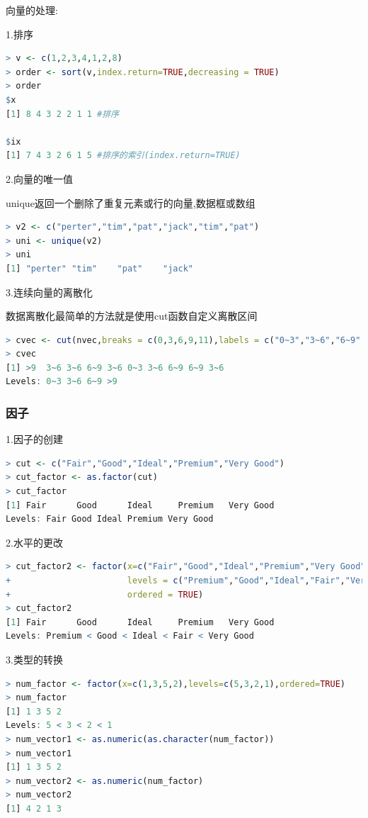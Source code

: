 \documentclass[11pt,a4paper,oneside]{book}
\begin{document}
向量的处理:

1.排序
\begin{lstlisting}[language=r]
> v <- c(1,2,3,4,1,2,8)
> order <- sort(v,index.return=TRUE,decreasing = TRUE)
> order
$x
[1] 8 4 3 2 2 1 1 #排序

$ix
[1] 7 4 3 2 6 1 5 #排序的索引(index.return=TRUE)
\end{lstlisting}

2.向量的唯一值

unique返回一个删除了重复元素或行的向量,数据框或数组
\begin{lstlisting}[language=r]
> v2 <- c("perter","tim","pat","jack","tim","pat")
> uni <- unique(v2)
> uni
[1] "perter" "tim"    "pat"    "jack"  
\end{lstlisting}

3.连续向量的离散化

数据离散化最简单的方法就是使用cut函数自定义离散区间
\begin{lstlisting}[language=r]
> cvec <- cut(nvec,breaks = c(0,3,6,9,11),labels = c("0~3","3~6","6~9",">9"))
> cvec
[1] >9  3~6 3~6 6~9 3~6 0~3 3~6 6~9 6~9 3~6
Levels: 0~3 3~6 6~9 >9
\end{lstlisting}

\subsubsection{因子}
1.因子的创建
\begin{lstlisting}[language=r]
> cut <- c("Fair","Good","Ideal","Premium","Very Good")
> cut_factor <- as.factor(cut)
> cut_factor
[1] Fair      Good      Ideal     Premium   Very Good
Levels: Fair Good Ideal Premium Very Good
\end{lstlisting}

2.水平的更改
\begin{lstlisting}[language=r]
> cut_factor2 <- factor(x=c("Fair","Good","Ideal","Premium","Very Good"),
+                       levels = c("Premium","Good","Ideal","Fair","Very Good"),
+                       ordered = TRUE)
> cut_factor2
[1] Fair      Good      Ideal     Premium   Very Good
Levels: Premium < Good < Ideal < Fair < Very Good
\end{lstlisting}

3.类型的转换
\begin{lstlisting}[language=r]
> num_factor <- factor(x=c(1,3,5,2),levels=c(5,3,2,1),ordered=TRUE)
> num_factor
[1] 1 3 5 2
Levels: 5 < 3 < 2 < 1
> num_vector1 <- as.numeric(as.character(num_factor))
> num_vector1
[1] 1 3 5 2
> num_vector2 <- as.numeric(num_factor)
> num_vector2
[1] 4 2 1 3
\end{lstlisting}
\end{document}
